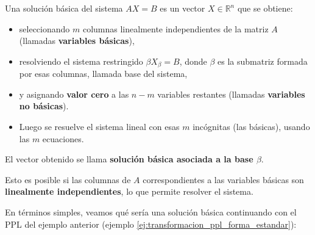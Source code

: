 Una solución básica del sistema \(AX=B\) es un vector \(X \in \mathbb{R}^n\) que se obtiene:
\begin{itemize}
  \item seleccionando \(m\) columnas linealmente independientes de la matriz \(A\) (llamadas \textbf{variables básicas}),
  \item resolviendo el sistema restringido \(\beta X_\beta = B\), donde \(\beta\) es la submatriz formada por esas columnas, llamada base del sistema,
  \item y asignando \textbf{valor cero} a las \(n - m\) variables restantes (llamadas \textbf{variables no básicas}).
  \item Luego se resuelve el sistema lineal con esas \(m\) incógnitas (las básicas), usando las \(m\) ecuaciones.
\end{itemize}
El vector obtenido se llama \textbf{solución básica asociada a la base \(\beta\)}.

Esto es posible si las columnas de \(A\) correspondientes a las variables básicas son \textbf{linealmente independientes}, lo que permite resolver el sistema.

En términos simples, veamos qué sería una solución básica continuando con el PPL del ejemplo anterior (ejemplo \ref{ej:transformacion_ppl_forma_estandar}):

